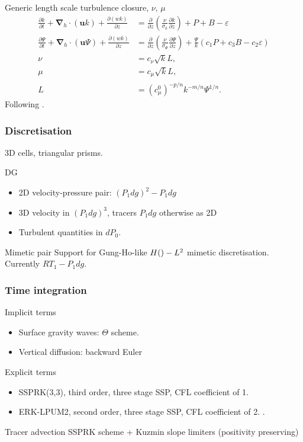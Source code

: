 \documentclass{beamer}
\renewcommand{\vec}[1]{\ensuremath{\boldsymbol{#1}}}
\newcommand{\ddt}[1]{\frac{\partial #1}{\partial t}}
\newcommand{\dd}[2]{\frac{\partial #1}{\partial #2}}
\newcommand{\nablah}{\ensuremath{\vec{\nabla}_{\!\!h}}}
\let\div\relax
\DeclareMathOperator{\div}{div}
\begin{document}
\begin{frame}[allowframebreaks]
\begin{block}{Generic length scale turbulence closure, $\nu$, $\mu$}
  \begin{align*}
    \ddt{k} + \nablah \cdot (\vec{u} k) + \dd{(w k)}{z} &= \dd{}{z}\left(\frac{\nu}{\sigma_k} \dd{k}{z}\right) + P + B - \varepsilon\\
    \dd{\Psi}{t} + \nablah \cdot (\vec{u} \Psi) + \dd{(w k)}{z} &= \dd{}{z}\left(\frac{\nu}{\sigma_\Psi} \dd{\Psi}{z}\right) + \frac{\Psi}{k}(c_1 P + c_3 B - c_2 \varepsilon) \\
    \nu &= c_\nu \sqrt{k} L, \\
    \mu &= c_{\mu} \sqrt{k} L, \\
    L &= \left(c_\mu^0\right)^{-p/n} k^{-m/n} \Psi^{1/n}.
  \end{align*}
  Following \cite{Umlauf:2003}.
\end{block}
\end{frame}

\begin{frame}
  \frametitle{Discretisation}
  3D cells, triangular prisms.
  \begin{block}{DG}
    \begin{itemize}
    \item 2D velocity-pressure pair: $(P_1dg)^2-P_1dg$
    \item 3D velocity in $(P_1dg)^3$, tracers $P_1dg$ otherwise as 2D
    \item Turbulent quantities in $dP_0$.
    \end{itemize}
  \end{block}
  \begin{block}{Mimetic pair}
    Support for Gung-Ho-like $H(\div)-L^2$ mimetic discretisation.
    Currently $RT_1-P_1dg$.
  \end{block}
\end{frame}


\begin{frame}
  \frametitle{Time integration}
  \begin{block}{Implicit terms}
    \begin{itemize}
    \item Surface gravity waves: $\Theta$ scheme.
    \item Vertical diffusion: backward Euler
    \end{itemize}
  \end{block}
  \begin{block}{Explicit terms}
    \begin{itemize}
    \item SSPRK(3,3), third order, three stage SSP, CFL coefficient of 1.
    \item ERK-LPUM2, second order, three stage SSP, CFL coefficient of
      2.  \cite{Higueras:2014}.
    \end{itemize}
  \end{block}
  \begin{block}{Tracer advection}
    SSPRK scheme + Kuzmin slope limiters (positivity preserving)
  \end{block}
\end{frame}
\end{document}
